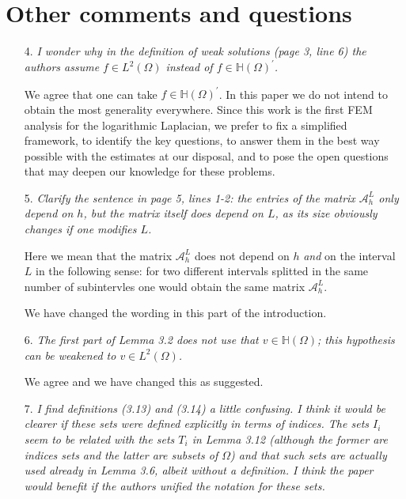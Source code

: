 \documentclass[11 pt]{article}
\numberwithin{equation}{section}
\begin{document}
\section*{Other comments and questions}

\begin{enumerate}
    \item[4.] \emph{I wonder why in the definition of weak solutions (page 3, line 6) the authors assume \(f\in L^{2}(\Omega)\) instead of \(f\in\mathbb{H}(\Omega)^{\prime}\).}

    We agree that one can take \(f\in\mathbb{H}(\Omega)^{\prime}\). In this paper we do not intend to obtain the most generality everywhere. Since this work is the first FEM analysis for the logarithmic Laplacian, we prefer to fix a simplified framework, to identify the key questions, to answer them in the best way possible with the estimates at our disposal, and to pose the open questions that may deepen our knowledge for these problems.

    \item[5.] \emph{Clarify the sentence in page 5, lines 1-2: the entries of the matrix \({\mathcal{A}}_{h}^{L}\) only depend on \(h\), but the matrix itself does depend on \(L\), as its size obviously changes if one modifies \(L\).}

    Here we mean that the matrix \({\mathcal{A}}_{h}^{L}\) does not depend on $h$ \emph{and} on the interval $L$ in the following sense: for two different intervals splitted in the same number of subintervles one would obtain the same matrix \({\mathcal{A}}_{h}^{L}\).

    We have changed the wording in this part of the introduction.

    \item[6.] \emph{The first part of Lemma 3.2 does not use that \(v\in\mathbb{H}(\Omega)\); this hypothesis can be weakened to \(v\in L^{2}(\Omega)\).}

    We agree and we have changed this as suggested.

    \item[7.] \emph{I find definitions (3.13) and (3.14) a little confusing. I think it would be clearer if these sets were defined explicitly in terms of indices. The sets \(I_{i}\) seem to be related with the sets \(T_{i}\) in Lemma 3.12 (although the former are indices sets and the latter are subsets of \(\Omega\)) and that such sets are actually used already in Lemma 3.6, albeit without a definition. I think the paper would benefit if the authors unified the notation for these sets.}


\end{enumerate}
\end{document}

